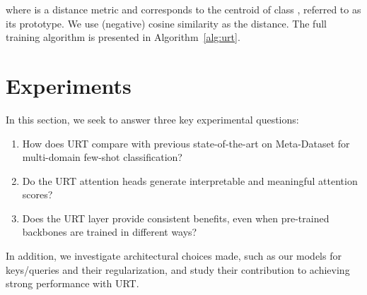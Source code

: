 \documentclass{article}
\begin{document}
where  is a distance metric and  corresponds to the centroid of class , referred to as its prototype. We use (negative) cosine similarity as the distance.
The full training algorithm is presented in Algorithm~\ref{alg:urt}.






\section{Experiments}

In this section, we seek to answer three key experimental questions:
\begin{enumerate}[label=\textbf{Q\arabic*}, itemsep=2pt, parsep=2pt, leftmargin=*, topsep=2pt]
    \item How does URT compare with previous state-of-the-art on Meta-Dataset for multi-domain few-shot classification?
    \item Do the URT attention heads generate interpretable and meaningful attention scores? 
     \item Does the URT layer provide consistent benefits, even when pre-trained backbones are trained in different ways? 
\end{enumerate}
In addition, we investigate architectural choices made, such as our models for keys/queries and their regularization, and study their contribution to achieving strong performance with URT. 
\end{document}
